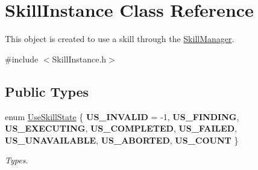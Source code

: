 \hypertarget{class_skill_instance}{}\section{Skill\+Instance Class Reference}
\label{class_skill_instance}


This object is created to use a skill through the \hyperlink{class_skill_manager}{Skill\+Manager}.  




{\ttfamily \#include $<$Skill\+Instance.\+h$>$}

\subsection*{Public Types}
\begin{DoxyCompactItemize}
\item 
\mbox{\label{class_skill_instance_a19403519edc60dad57c324d9e976a811}} 
enum \hyperlink{class_skill_instance_a19403519edc60dad57c324d9e976a811}{Use\+Skill\+State} \{ \newline
{\bfseries U\+S\+\_\+\+I\+N\+V\+A\+L\+ID} = -\/1, 
{\bfseries U\+S\+\_\+\+F\+I\+N\+D\+I\+NG}, 
{\bfseries U\+S\+\_\+\+E\+X\+E\+C\+U\+T\+I\+NG}, 
{\bfseries U\+S\+\_\+\+C\+O\+M\+P\+L\+E\+T\+ED}, 
\newline
{\bfseries U\+S\+\_\+\+F\+A\+I\+L\+ED}, 
{\bfseries U\+S\+\_\+\+U\+N\+A\+V\+A\+I\+L\+A\+B\+LE}, 
{\bfseries U\+S\+\_\+\+A\+B\+O\+R\+T\+ED}, 
{\bfseries U\+S\+\_\+\+C\+O\+U\+NT}
 \}\begin{DoxyCompactList}\small\item\em Types. \end{DoxyCompactList}
\end{DoxyCompactItemize}
